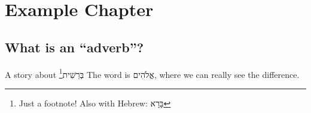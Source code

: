 
\chapter{Example Chapter}  %



\section{What is an ``adverb''?}

A story about \texthebrew{בְּרֵשִׁית}\footnote{Just a footnote! Also with Hebrew: \texthebrew{בָּרָא}}
The word is \texthebrew{אֱלֹהִים}, where we can really see the difference.

\begin{adjustbox}{width=1\textwidth}

\end{adjustbox}
